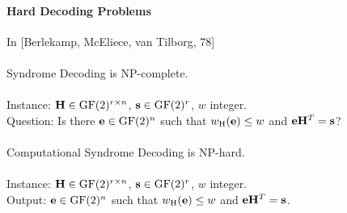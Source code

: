 \documentclass[a4paper, 11pt, openany]{book}
\numberwithin{equation}{section}
\theoremstyle{plain}
\theoremstyle{definition}
\newcommand{\GF}{\mathrm{GF}}
\newcommand{\wH}{w_\mathrm{H}}
\newcommand{\code}[1]{\mathsf{#1}}
\begin{document}








\paragraph{Hard Decoding Problems}

In [Berlekamp, McEliece,  van Tilborg, 78]\\
~\\
Syndrome Decoding is NP-complete.\\
~\\
Instance: ${\bf H} \in \GF(2)^{r \times n}$, ${\bf s} \in \GF(2)^r$, $w$ integer.\\
Question: Is there ${\bf e} \in \GF(2)^n$ such that $\wH({\bf e}) \le w$ and ${\bf e} {\bf H}^T = {\bf s}$?\\
~\\
Computational Syndrome Decoding is NP-hard.\\
~\\
Instance: ${\bf H} \in \GF(2)^{r \times n}$, ${\bf s} \in \GF(2)^r$, $w$ integer.\\
Output: ${\bf e} \in \GF(2)^n$ such that $\wH({\bf e}) \le w$ and ${\bf e} {\bf H}^T = {\bf s}$.
\end{document}
